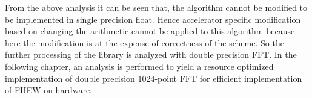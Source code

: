 \vspace{0.25cm}
\noindent From the above analysis it can be seen that, the algorithm cannot be modified to be implemented in single precision float. Hence accelerator specific modification based on changing the arithmetic cannot be applied to this algorithm because here the modification is at the expense of correctness of the scheme. So the further processing of the library is analyzed with double precision FFT. In the following chapter, an analysis is performed to yield a resource optimized implementation of double precision 1024-point FFT for efficient implementation of FHEW on hardware.



